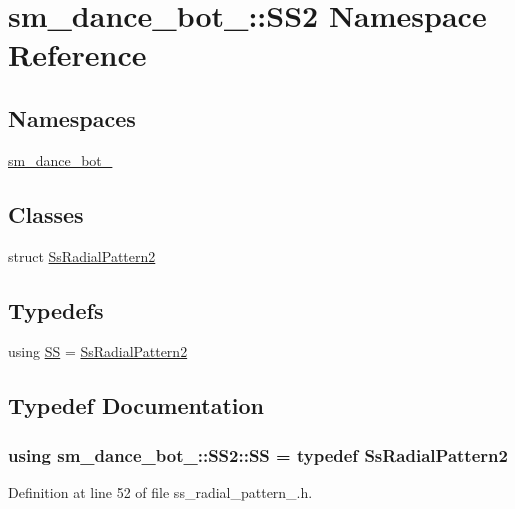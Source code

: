 \hypertarget{namespacesm__dance__bot__3_1_1SS2}{}\section{sm\+\_\+dance\+\_\+bot\+\_\+:\+:S\+S2 Namespace Reference}
\label{namespacesm__dance__bot__3_1_1SS2}
\subsection*{Namespaces}
\begin{DoxyCompactItemize}
\item 
 \hyperlink{namespacesm__dance__bot__3_1_1SS2_1_1sm__dance__bot__3}{sm\+\_\+dance\+\_\+bot\+\_}
\end{DoxyCompactItemize}
\subsection*{Classes}
\begin{DoxyCompactItemize}
\item 
struct \hyperlink{structsm__dance__bot__3_1_1SS2_1_1SsRadialPattern2}{Ss\+Radial\+Pattern2}
\end{DoxyCompactItemize}
\subsection*{Typedefs}
\begin{DoxyCompactItemize}
\item 
using \hyperlink{namespacesm__dance__bot__3_1_1SS2_ae79ad46f5855381231ed20957cbfedfb}{SS} = \hyperlink{structsm__dance__bot__3_1_1SS2_1_1SsRadialPattern2}{Ss\+Radial\+Pattern2}
\end{DoxyCompactItemize}


\subsection{Typedef Documentation}
\subsubsection[{\texorpdfstring{SS}{SS}}]{\setlength{\rightskip}{0pt plus 5cm}using {\bf sm\+\_\+dance\+\_\+bot\+\_\+::\+S\+S2\+::\+SS} = typedef {\bf Ss\+Radial\+Pattern2}}\hypertarget{namespacesm__dance__bot__3_1_1SS2_ae79ad46f5855381231ed20957cbfedfb}{}\label{namespacesm__dance__bot__3_1_1SS2_ae79ad46f5855381231ed20957cbfedfb}


Definition at line 52 of file ss\+\_\+radial\+\_\+pattern\+\_.\+h.

